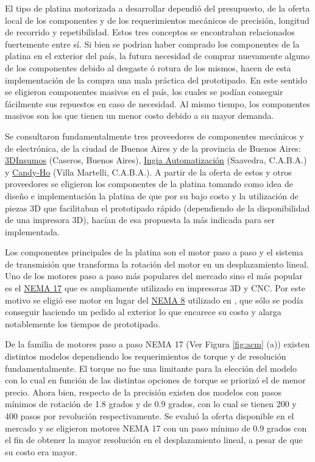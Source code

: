 El tipo de platina motorizada a desarrollar dependió del presupuesto, de la oferta local de los componentes y de los requerimientos mecánicos de precisión, longitud de recorrido y repetibilidad. Estos tres conceptos se encontraban relacionados fuertemente entre sí. Si bien se podrian haber comprado los componentes de la platina en el exterior del país, la futura necesidad de comprar nuevamente alguno de los componentes debido al desgaste ó rotura de los mismos, hacen de esta implementación de la compra una mala práctica del prototipado. En este sentido se eligieron componentes masivos en el país, los cuales se podían conseguir fácilmente sus repuestos en caso de necesidad. Al mismo tiempo, los componentes masivos son los que tienen un menor costo debido a su mayor demanda.

Se consultaron fundamentalmente tres proveedores de componentes mecánicos y de electrónica, de la ciudad de Buenos Aires y de la provincia de Buenos Aires: \href{https://3dinsumos.com.ar/}{3DInsumos} (Caseros, Buenos Aires), \href{https://ingia.com.ar/}{Ingia Automatización} (Saavedra, C.A.B.A.) y \href{https://candy-ho.com/}{Candy-Ho} (Villa Martelli, C.A.B.A.). A partir de la oferta de estos y otros proveedores se eligieron los componentes de la platina tomando como idea de diseño e implementación la platina de \cite{schaa} que por su bajo costo y la utilización de piezas 3D que facilitaban el prototipado rápido (dependiendo de la disponibilidad de una impresora 3D), hacían de esa propuesta la más indicada para ser implementada.

Los componentes principales de la platina son el motor paso a paso y el sistema de transmisión que transforma la rotación del motor en un desplazamiento lineal. Uno de los motores paso a paso más populares del mercado sino el más popular es el \href{https://www.pololu.com/product/1200}{NEMA 17} que es ampliamente utilizado en impresoras 3D y CNC. Por este motivo se eligió ese motor en lugar del \href{https://www.pololu.com/product/1204}{NEMA 8} utilizado en \cite{schaa}, que sólo se podía conseguir haciendo un pedido al exterior lo que encarece su costo y alarga notablemente los tiempos de prototipado.

De la familia de motores paso a paso NEMA 17 (Ver Figura \ref{fig:acm} (a)) existen distintos modelos dependiendo los requerimientos de torque y de resolución fundamentalmente. El torque no fue una limitante para la elección del modelo con lo cual en función de las distintas opciones de torque se priorizó el de menor precio. Ahora bien, respecto de la precisión existen dos modelos con pasos mínimos de rotación de 1.8 grados y de 0.9 grados, con lo cual se tienen 200 y 400 pasos por revolución respectivamente. Se evaluó la oferta disponible en el mercado y se eligieron motores NEMA 17 con un paso mínimo de 0.9 grados con el fin de obtener la mayor resolución en el desplazamiento lineal, a pesar de que su costo era mayor.

